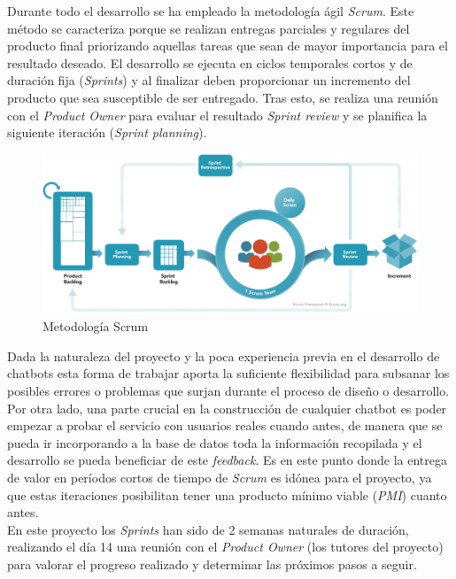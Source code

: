 Durante todo el desarrollo se ha empleado la metodología ágil \textit{Scrum}. Este método se caracteriza porque se realizan entregas parciales y regulares del producto final priorizando aquellas tareas que sean de mayor importancia para el resultado deseado. El desarrollo se ejecuta en ciclos temporales cortos y de duración fija (\textit{Sprints}) y al finalizar deben proporcionar un incremento del producto que sea susceptible de ser entregado. Tras esto, se realiza una reunión con el \textit{Product Owner} para evaluar el resultado \textit{Sprint review} y se planifica la siguiente iteración (\textit{Sprint planning}).\\

\begin{figure}[h]
\centering
\includegraphics[scale=0.4]{../images/scrum.png} 
\caption{Metodología Scrum}
\label{fig:x scrum}
\end{figure}

Dada la naturaleza del proyecto y la poca experiencia previa en el desarrollo de chatbots esta forma de trabajar aporta la suficiente flexibilidad para subsanar los posibles errores o problemas que surjan durante el proceso de diseño o desarrollo. Por otra lado, una parte crucial en la construcción de cualquier chatbot es poder empezar a probar el servicio con usuarios reales cuando antes, de manera que se pueda ir incorporando a la base de datos toda la información recopilada y el desarrollo se pueda beneficiar de este \textit{feedback}. Es en este punto donde la entrega de valor en períodos cortos de tiempo de \textit{Scrum} es idónea para el proyecto, ya que estas iteraciones posibilitan tener una producto mínimo viable (\textit{PMI}) cuanto antes.\\

En este proyecto los \textit{Sprints} han sido de 2 semanas naturales de duración, realizando el día 14 una reunión con el \textit{Product Owner} (los tutores del proyecto) para valorar el progreso realizado y determinar las próximos pasos a seguir. \\

